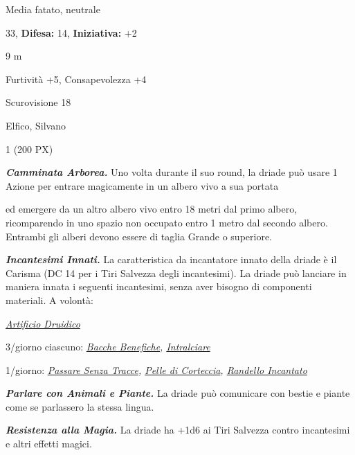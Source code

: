 \begin{multicols}{2}
{
\noindent
\begin{description}[noitemsep, topsep=0pt, parsep=0pt, partopsep=0pt, leftmargin=0cm, labelwidth=2.2cm]
	\item[\textbf{Taglia/Tipo:}] Media fatato, neutrale
	\item[\textbf{Caratt.:}] 
	\item[\textbf{Punti Ferita:}] 33,  \textbf{Difesa:} 14,  \textbf{Iniziativa:} +2
	\item[\textbf{Movimento:}] 9 m
	\item[\textbf{Tiri Salvez.:}] 
	\item[\textbf{Comp.:}] Furtività +5, Consapevolezza +4
	\item[\textbf{Sensi:}] Scurovisione 18
	\item[\textbf{Linguaggi:}] Elfico, Silvano
	\item[\textbf{Sfida:}] 1 (200 PX)\smallskip
\end{description}

\emph{\textbf{Camminata Arborea.}} Uno volta durante il suo round, la driade può usare 1 Azione per entrare magicamente in un albero vivo a sua portata

ed emergere da un altro albero vivo entro 18 metri dal primo albero, ricomparendo in uno spazio non occupato entro 1 metro dal secondo albero. Entrambi gli alberi devono essere di taglia Grande o superiore.

\emph{\textbf{Incantesimi Innati.}} La caratteristica da incantatore innato della driade è il Carisma (DC 14 per i Tiri Salvezza degli incantesimi). La driade può lanciare in maniera innata i seguenti incantesimi, senza aver bisogno di componenti materiali. A volontà:

\emph{\hyperlink{Artificio Druidico}{Artificio Druidico}}

3/giorno ciascuno: \emph{\hyperlink{Bacche Benefiche}{Bacche Benefiche}, \hyperlink{Intralciare}{Intralciare}}

1/giorno: \emph{\hyperlink{Passare Senza Tracce}{Passare Senza Tracce}, \hyperlink{Pelle di Corteccia}{Pelle di Corteccia}, \hyperlink{Randello incantato}{Randello Incantato}}

\emph{\textbf{Parlare con Animali e Piante.}} La driade può comunicare con bestie e piante come se parlassero la stessa lingua.

\emph{\textbf{Resistenza alla Magia.}} La driade ha +1d6 ai Tiri Salvezza contro incantesimi e altri effetti magici.


}
\end{multicols}

